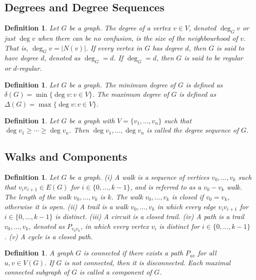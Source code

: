 \documentclass[11pt]{article}
\newtheorem{definition}[theorem]{Definition}
\begin{document}
\subsection{Degrees and Degree Sequences}
\begin{definition}
Let $G$ be a graph. The degree of a vertex $v\in V$, denoted $\deg_G v$ or just $\deg v$ when there can be no confusion, is the size of the neighbourhood of $v$. That is, $\deg_G v=|N(v)|$. If every vertex in $G$ has degree $d$, then $G$ is said to have degree $d$, denoted as $\deg_G =d$. If $\deg_G =d$, then $G$ is said to be regular or $d$-regular.
\end{definition}
\begin{definition}
Let $G$ be a graph. The minimum degree of $G$ is defined as 
$\delta(G)=\min\{\deg v: v\in V\}$. 
The maximum degree of $G$ is defined as 
$\Delta(G)=\max\{\deg v: v\in V\}$. 
\end{definition}
\begin{definition}
Let $G$ be a graph with $V=\{v_1,\dots,v_n\}$ such that $\deg v_1\ge\cdots\ge\deg v_n$. Then $\deg v_1,\dots,\deg v_n$ is called the degree sequence of $G$.
\end{definition}
\subsection{Walks and Components}
\begin{definition}
Let $G$ be a graph. 
(i) A walk is a sequence of vertices $v_0,\dots,v_k$ such that $v_i v_{i+1}\in E(G)$ for $i\in\{0,\dots,k-1\}$, and is referred to as a $v_0\!-\!v_k$ walk. The length of the walk $v_0,\dots,v_k$ is $k$. The walk $v_0,\dots,v_k$ is closed if $v_0=v_k$, otherwise it is open. 
(ii) A trail is a walk $v_0,\dots,v_k$ in which every edge $v_i v_{i+1}$ for $i\in\{0,\dots,k-1\}$ is distinct. 
(iii) A circuit is a closed trail. 
(iv) A path is a trail $v_0,\dots,v_k$, denoted as $P_{v_0v_k}$, in which every vertex $v_i$ is distinct for $i\in\{0,\dots,k-1\}$. 
(v) A cycle is a closed path. 
\end{definition}
\begin{definition}
A graph $G$ is connected if there exists a path $P_{uv}$ for all $u,v\in V(G)$. If $G$ is not connected, then it is disconnected. Each maximal connected subgraph of $G$ is called a component of $G$.
\end{definition}
\end{document}
